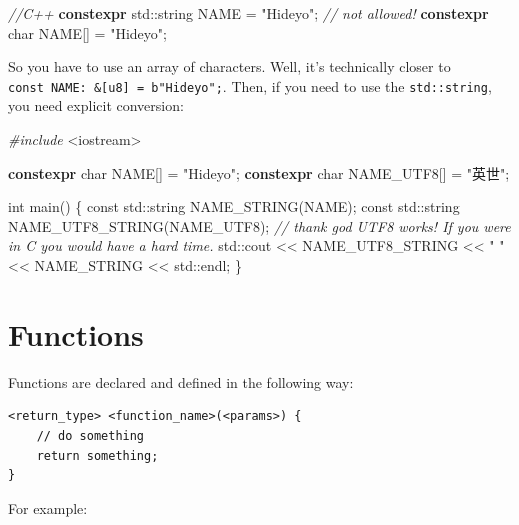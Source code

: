 \documentclass[
]{book}
\newenvironment{Shaded}{\begin{snugshade}}{\end{snugshade}}
\newcommand{\AttributeTok}[1]{\textcolor[rgb]{0.77,0.63,0.00}{#1}}
\newcommand{\BuiltInTok}[1]{#1}
\newcommand{\CommentTok}[1]{\textcolor[rgb]{0.56,0.35,0.01}{\textit{#1}}}
\newcommand{\DataTypeTok}[1]{\textcolor[rgb]{0.13,0.29,0.53}{#1}}
\newcommand{\ImportTok}[1]{#1}
\newcommand{\KeywordTok}[1]{\textcolor[rgb]{0.13,0.29,0.53}{\textbf{#1}}}
\newcommand{\NormalTok}[1]{#1}
\newcommand{\PreprocessorTok}[1]{\textcolor[rgb]{0.56,0.35,0.01}{\textit{#1}}}
\newcommand{\StringTok}[1]{\textcolor[rgb]{0.31,0.60,0.02}{#1}}
\begin{document}
\begin{Shaded}
\begin{Highlighting}[]
\CommentTok{//C++}
\KeywordTok{constexpr} \BuiltInTok{std::}\NormalTok{string NAME = }\StringTok{"Hideyo"}\NormalTok{; }\CommentTok{// not allowed!}
\KeywordTok{constexpr} \DataTypeTok{char}\NormalTok{ NAME[] = }\StringTok{"Hideyo"}\NormalTok{;}
\end{Highlighting}
\end{Shaded}

So you have to use an array of characters. Well, it's technically closer to \texttt{const\ NAME:\ \&{[}u8{]}\ =\ b"Hideyo";}. Then, if you need to use the \texttt{std::string}, you need explicit conversion:

\begin{Shaded}
\begin{Highlighting}[]
\PreprocessorTok{\#include }\ImportTok{\textless{}iostream\textgreater{}}

\KeywordTok{constexpr} \DataTypeTok{char}\NormalTok{ NAME[] = }\StringTok{"Hideyo"}\NormalTok{;}
\KeywordTok{constexpr} \DataTypeTok{char}\NormalTok{ NAME\_UTF8[] = }\StringTok{"英世"}\NormalTok{;}

\DataTypeTok{int}\NormalTok{ main()}
\NormalTok{\{}
    \AttributeTok{const} \BuiltInTok{std::}\NormalTok{string NAME\_STRING(NAME);}
    \AttributeTok{const} \BuiltInTok{std::}\NormalTok{string NAME\_UTF8\_STRING(NAME\_UTF8);}
    \CommentTok{// thank god UTF8 works! If you were in C you would have a hard time.}
    \BuiltInTok{std::}\NormalTok{cout \textless{}\textless{} NAME\_UTF8\_STRING \textless{}\textless{} }\StringTok{" "}\NormalTok{ \textless{}\textless{} NAME\_STRING \textless{}\textless{} }\BuiltInTok{std::}\NormalTok{endl;}
\NormalTok{\}}
\end{Highlighting}
\end{Shaded}

\hypertarget{functions}{%
\section{Functions}\label{functions}}

Functions are declared and defined in the following way:

\begin{verbatim}
<return_type> <function_name>(<params>) {
    // do something
    return something;
}
\end{verbatim}

For example:
\end{document}
